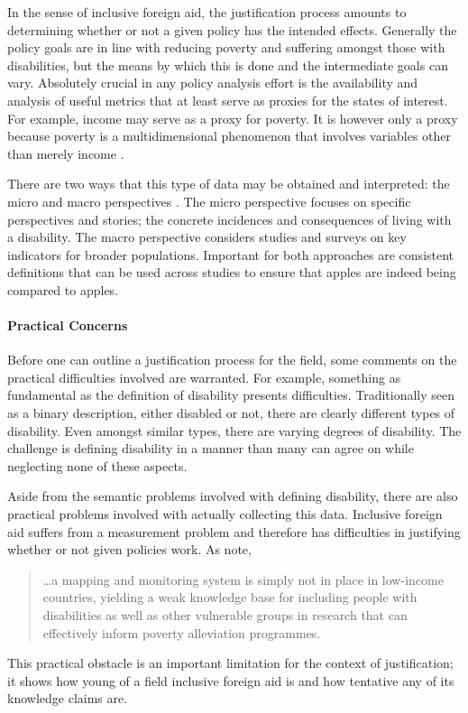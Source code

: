 \documentclass[a4paper]{article}
\begin{document}
In the sense of inclusive foreign aid, the justification process amounts to
determining whether or not a given policy has the intended effects. Generally
the policy goals are in line with reducing poverty and suffering amongst those
with disabilities, but the means by which this is done and the intermediate
goals can vary. Absolutely crucial in any policy analysis effort is the
availability and analysis of useful metrics that at least serve as proxies for
the states of interest. For example, income may serve as a proxy for poverty.
It is however only a proxy because poverty is a multidimensional phenomenon
that involves variables other than merely income
\citep{alkire2011understandings}.

There are two ways that this type of data may be obtained and interpreted: the
micro and macro perspectives \citep{ingstad2011disability}.
The micro perspective focuses on specific perspectives and stories; the
concrete incidences and consequences of living with a disability. The macro
perspective considers studies and surveys on key indicators for broader
populations. Important for both approaches are consistent definitions that can
be used across studies to ensure that apples are indeed being compared to
apples.

\paragraph{Practical Concerns}

Before one can outline a justification process for the field, some comments on
the practical difficulties involved are warranted. For example, something as
fundamental as the definition of disability presents difficulties.
Traditionally seen as a binary description, either disabled or not, there are
clearly different types of disability. Even amongst similar types, there are
varying degrees of disability. The challenge is defining disability in a
manner than many can agree on while neglecting none of these aspects.

Aside from the semantic problems involved with defining disability, there are
also practical problems involved with actually collecting this data.
Inclusive foreign aid suffers from a measurement problem and therefore has
difficulties in justifying whether or not given policies work. As
\cite{ingstad2011disability} note,
%
\begin{quote}
    \ldots a mapping and monitoring system is simply not in place in
    low-income countries, yielding a weak knowledge base for including people
    with disabilities as well as other vulnerable groups in research that can
    effectively inform poverty alleviation programmes.
\end{quote}
%
This practical obstacle is an important limitation for the context of
justification; it shows how young of a field inclusive foreign aid is and how
tentative any of its knowledge claims are.
\end{document}

